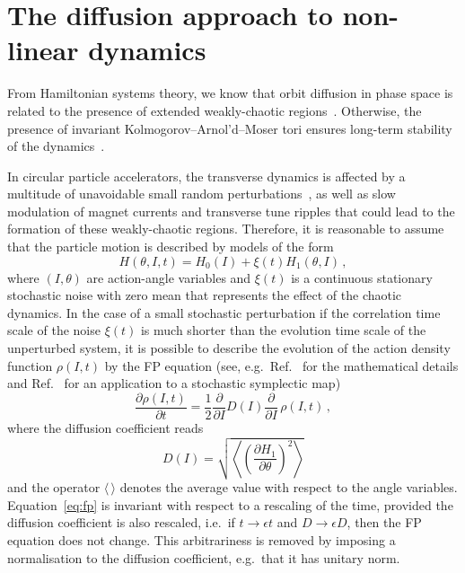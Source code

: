 
\section{The diffusion approach to non-linear dynamics}
\label{sec:the_diffusion_approach}


From Hamiltonian systems theory, we know that orbit diffusion in phase space is related to the presence of extended weakly-chaotic regions~\cite{froeschle1999weak}. Otherwise, the presence of invariant Kolmogorov--Arnol'd--Moser tori ensures long-term stability of the dynamics~\cite{morbidelli1995connection}.

In circular particle accelerators, the transverse dynamics is affected by a multitude of unavoidable small random perturbations~\cite{ellison1999noise}, as well as slow modulation of magnet currents and transverse tune ripples that could lead to the formation of these weakly-chaotic regions. Therefore, it is reasonable to assume that the particle motion is described by models of the form 
\begin{equation}
H(\theta, I, t)=H_{0}(I)+ \xi(t) H_{1}(\theta, I) \, , 
\label{hstoc}
\end{equation}
where $(I, \theta)$ are action-angle variables and $\xi(t)$ is a continuous stationary stochastic noise with zero mean that represents the effect of the chaotic dynamics. In the case of a small stochastic perturbation if the correlation time scale of the noise $\xi(t)$ is much shorter than the evolution time scale of the unperturbed system, it is possible to describe the evolution of the action density function $\rho(I,t)$ by the FP equation (see, e.g.\ Ref.~\cite{bazzani2020diffusion} for the mathematical details and Ref.~\cite{Montanari:2728138} for an application to a stochastic symplectic map)
\begin{equation}
    \frac{\partial \rho (I, t)}{\partial t}=\frac{1}{2} \frac{\partial}{\partial I} {D}(I) \frac{\partial}{\partial I}\, \rho(I, t) \, ,
    \label{eq:fp}
\end{equation}
where the diffusion coefficient reads
\begin{equation}
D(I)=\sqrt{\left \langle \left (\frac{\partial H_1}{\partial \theta} \right )^2 \right \rangle}
\label{qsapp}
\end{equation}    
and the operator $\langle\,\rangle$ denotes the average value with respect to the angle variables. {Equation~\eqref{eq:fp} is invariant with respect to a rescaling of the time, provided the diffusion coefficient is also rescaled, i.e.\ if $t \to \epsilon t $ and $D \to \epsilon D$, then the FP equation does not change. This arbitrariness is removed by imposing a normalisation to the diffusion coefficient, e.g.\ that it has unitary norm.}


